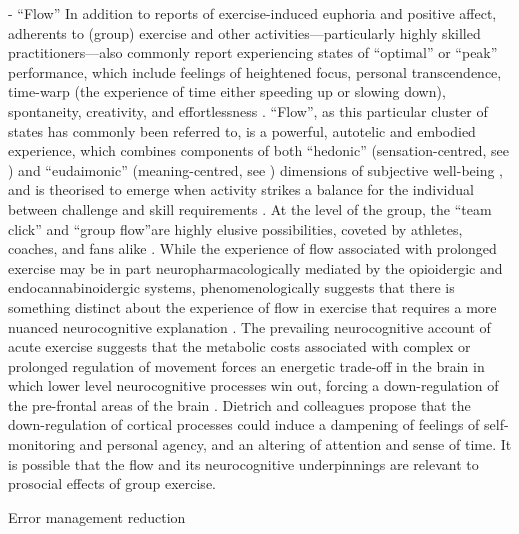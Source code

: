 \documentclass[12pt]{report}
\begin{document}
- ``Flow''
In addition to reports of exercise-induced euphoria and positive affect, adherents to (group) exercise and other activities—particularly highly skilled practitioners—also commonly report experiencing states of ``optimal'' or ``peak'' performance, which include feelings of heightened focus, personal transcendence, time-warp (the experience of time either speeding up or slowing down), spontaneity, creativity, and effortlessness \citep{Jackson1995a}.  ``Flow'', as this particular cluster of states has commonly been referred to, is a powerful, autotelic  and embodied experience, which combines components of both ``hedonic'' (sensation-centred, see \citep{Huta2010}) and ``eudaimonic'' (meaning-centred, see \cite{Ryff1989,Ryff2015}) dimensions of subjective well-being \citep{}, and is theorised to emerge when activity strikes a balance for the individual between challenge and skill requirements \citep{Csikszentmihalyi1990,Abuhamdeh2012}.  At the level of the group, the ``team click'' and ``group flow''are highly elusive possibilities, coveted by athletes, coaches, and fans alike \citep{Novak1993,Sawyer2006}.  While the experience of flow associated with prolonged exercise may be in part neuropharmacologically mediated by the opioidergic and endocannabinoidergic systems, phenomenologically suggests that there is something distinct about the experience of flow in exercise that requires a more nuanced neurocognitive explanation \cite{Dietrich2006,Dietrich2011}.  The prevailing  neurocognitive account of acute exercise suggests that the metabolic costs associated with complex or prolonged regulation of movement forces an energetic trade-off in the brain in which lower level neurocognitive processes win out, forcing a down-regulation of the pre-frontal areas of the brain \citep{Dietrich2011}. Dietrich and colleagues propose that the down-regulation of cortical processes could induce a dampening of feelings of self-monitoring and personal agency, and an altering of attention and sense of time. It is possible that the flow and its neurocognitive underpinnings are relevant to prosocial effects of group exercise.

Error management reduction
\end{document}
